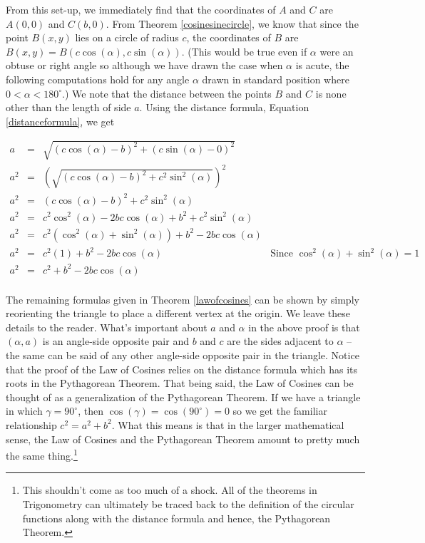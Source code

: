 From this set-up, we immediately find that the coordinates of $A$ and $C$ are $A(0,0)$ and $C(b,0)$.  From Theorem \ref{cosinesinecircle}, we know that since the point $B(x,y)$ lies on a circle of radius $c$, the coordinates of $B$ are $B(x,y) = B(c \cos(\alpha), c \sin(\alpha))$.  (This would be true even if $\alpha$ were an obtuse or right angle so although we have drawn the case when $\alpha$ is acute, the following computations hold for any angle $\alpha$ drawn in standard position where $0 < \alpha < 180^{\circ}$.)  We note that the distance between the points $B$ and $C$ is none other than the length of side $a$.  Using the distance formula, Equation \ref{distanceformula}, we get

\[\begin{array}{rclr}
a & = & \sqrt{(c \cos(\alpha) - b)^{2} + (c \sin(\alpha) - 0)^2} & \\ [3pt]
a^{2} & = & \left(\sqrt{(c \cos(\alpha) - b)^{2} + c^2 \sin^2(\alpha)}\right)^2 & \\  [3pt]
a^2 & = &  (c \cos(\alpha) - b)^{2} + c^2 \sin^2(\alpha) & \\  [3pt]
a^2 & = & c^2 \cos^2(\alpha) - 2bc \cos(\alpha) + b^2 + c^2 \sin^2(\alpha) & \\  [3pt]
a^2 & = & c^2\left(\cos^2(\alpha) + \sin^2(\alpha)\right) + b^2 - 2bc \cos(\alpha) & \\  [3pt]
a^2 & = & c^2(1) + b^2 - 2bc \cos(\alpha) & \text{Since $\cos^2(\alpha) + \sin^2(\alpha) = 1$}\\  [3pt]
a^2 & = & c^2 + b^2 - 2bc \cos(\alpha) & \\
\end{array} \]

The remaining formulas given in Theorem \ref{lawofcosines} can be shown by simply reorienting the triangle to place a different vertex at the origin.  We leave these details to the reader.  What's important about $a$ and $\alpha$ in the above proof is that $(\alpha,a)$ is an angle-side opposite pair and $b$ and $c$ are the sides adjacent to $\alpha$ -- the same can be said of any other angle-side opposite pair in the triangle.   Notice that the proof of the Law of Cosines relies on the distance formula which has its roots in the Pythagorean Theorem.  That being said, the Law of Cosines can be thought of as a generalization of the Pythagorean Theorem.  If we have a triangle in which $\gamma = 90^{\circ}$, then $\cos(\gamma) = \cos\left(90^{\circ}\right) = 0$ so we get the familiar relationship  $c^2 = a^2 + b^2$.  What this means is that in the larger mathematical sense, the Law of Cosines and the Pythagorean Theorem amount to pretty much the same thing.\footnote{This shouldn't come as too much of a shock.  All of the theorems in Trigonometry can ultimately be traced back to the definition of the circular functions along with the distance formula and hence, the Pythagorean Theorem.}

